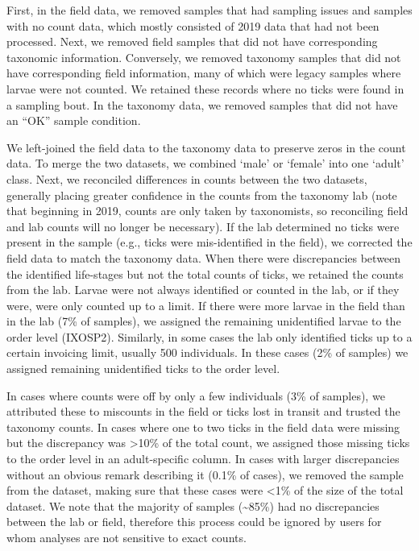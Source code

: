 \documentclass[
  12pt,
]{article}
\begin{document}
First, in the field data, we removed samples that had sampling issues and samples with no count data, which mostly consisted of 2019 data that had not been processed. Next, we removed field samples that did not have corresponding taxonomic information. Conversely, we removed taxonomy samples that did not have corresponding field information, many of which were legacy samples where larvae were not counted. We retained these records where no ticks were found in a sampling bout. In the taxonomy data, we removed samples that did not have an ``OK'' sample condition.

We left-joined the field data to the taxonomy data to preserve zeros in the count data. To merge the two datasets, we combined `male' or `female' into one `adult' class. Next, we reconciled differences in counts between the two datasets, generally placing greater confidence in the counts from the taxonomy lab (note that beginning in 2019, counts are only taken by taxonomists, so reconciling field and lab counts will no longer be necessary). If the lab determined no ticks were present in the sample (e.g., ticks were mis-identified in the field), we corrected the field data to match the taxonomy data. When there were discrepancies between the identified life-stages but not the total counts of ticks, we retained the counts from the lab. Larvae were not always identified or counted in the lab, or if they were, were only counted up to a limit. If there were more larvae in the field than in the lab (7\% of samples), we assigned the remaining unidentified larvae to the order level (IXOSP2). Similarly, in some cases the lab only identified ticks up to a certain invoicing limit, usually 500 individuals. In these cases (2\% of samples) we assigned remaining unidentified ticks to the order level.

In cases where counts were off by only a few individuals (3\% of samples), we attributed these to miscounts in the field or ticks lost in transit and trusted the taxonomy counts. In cases where one to two ticks in the field data were missing but the discrepancy was \textgreater10\% of the total count, we assigned those missing ticks to the order level in an adult-specific column. In cases with larger discrepancies without an obvious remark describing it (0.1\% of cases), we removed the sample from the dataset, making sure that these cases were \textless1\% of the size of the total dataset. We note that the majority of samples (\textasciitilde85\%) had no discrepancies between the lab or field, therefore this process could be ignored by users for whom analyses are not sensitive to exact counts.
\end{document}
